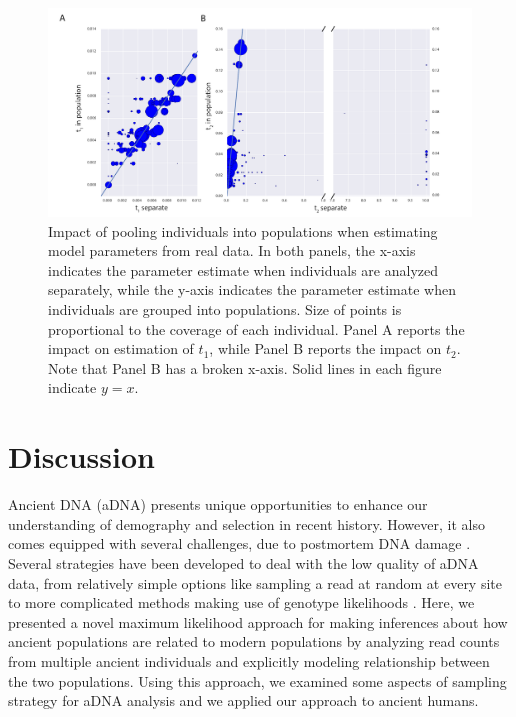 \documentclass[11pt, oneside]{article}   	%
\begin{document}
\begin{figure}[h] %
   \centering
   \includegraphics[width=\textwidth]{sep_vs_pops.pdf} 
   \caption{Impact of pooling individuals into populations when estimating model parameters from real data. In both panels, the x-axis indicates the parameter estimate when individuals are analyzed separately, while the y-axis indicates the parameter estimate when individuals are grouped into populations. Size of points is proportional to the coverage of each individual. Panel A reports the impact on estimation of $t_1$, while Panel B reports the impact on $t_2$. Note that Panel B has a broken x-axis. Solid lines in each figure indicate $y = x$.}
   \label{sep_vs_pops}
\end{figure}

\section{Discussion}

Ancient DNA (aDNA) presents unique opportunities to enhance our understanding of demography and selection in recent history. However, it also comes equipped with several challenges, due to postmortem DNA damage \citep{sawyer2012temporal}. Several strategies have been developed to deal with the low quality of aDNA data, from relatively simple options like sampling a read at random at every site \citep{green2010draft} to more complicated methods making use of genotype likelihoods \citep{racimo2016joint}. Here, we presented a novel maximum likelihood approach for making inferences about how ancient populations are related to modern populations by analyzing read counts from multiple ancient individuals and explicitly modeling relationship between the two populations. Using this approach, we examined some aspects of sampling strategy for aDNA analysis and we applied our approach to ancient humans.
\end{document}
